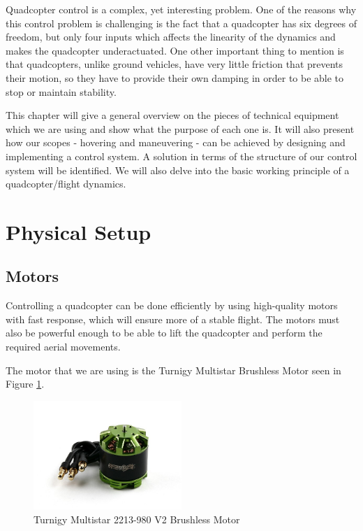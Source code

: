 Quadcopter control is a complex, yet interesting problem. One of the reasons why this control problem is challenging is the fact that a quadcopter has six degrees of freedom, but only four inputs which affects the linearity of the dynamics and makes the quadcopter underactuated. One other important thing to mention is that quadcopters, unlike ground vehicles, have very little friction that prevents their motion, so they have to provide their own damping in order to be able to stop or maintain stability.

This chapter will give a general overview on the pieces of technical equipment which we are using and show what the purpose of each one is. It will also present how our scopes - hovering and maneuvering - can be achieved by designing and implementing a control system. A solution in terms of the structure of our control system will be identified. We will also delve into the basic working principle of a quadcopter/flight dynamics.

\section{Physical Setup}
\subsection{Motors} \label{Motors}
Controlling a quadcopter can be done efficiently by using high-quality motors with fast response, which will ensure more of a stable flight. The motors must also be powerful enough to be able to lift the quadcopter and perform the required aerial movements. 

The motor that we are using is the Turnigy Multistar Brushless Motor seen in Figure \ref{motor}.

\begin{figure}[H]
  \centering
    \includegraphics[width=0.5\textwidth]{images/motor.jpg}
	\caption{Turnigy Multistar 2213-980 V2 Brushless Motor}
	\label{motor}
\end{figure}

